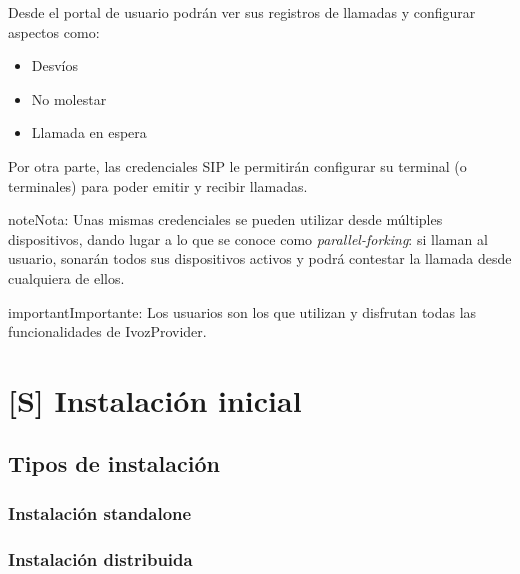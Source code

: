 \documentclass[letterpaper,10pt,spanish]{sphinxmanual}
\begin{document}
Desde el portal de usuario podrán ver sus registros de llamadas y configurar aspectos como:
\begin{itemize}
\item {} 
Desvíos

\item {} 
No molestar

\item {} 
Llamada en espera

\end{itemize}

Por otra parte, las credenciales SIP le permitirán configurar su terminal (o terminales) para poder emitir y recibir llamadas.

\begin{notice}{note}{Nota:}
Unas mismas credenciales se pueden utilizar desde múltiples dispositivos, dando lugar a lo que se conoce como \emph{parallel-forking}: si llaman al usuario, sonarán todos sus dispositivos activos y podrá contestar la llamada desde cualquiera de ellos.
\end{notice}

\begin{notice}{important}{Importante:}
Los usuarios son los que utilizan y disfrutan todas las funcionalidades de IvozProvider.
\end{notice}


\chapter{{[}S{]} Instalación inicial}
\label{installation/index:s-instalacion-inicial}\label{installation/index::doc}

\section{Tipos de instalación}
\label{installation/install_types::doc}\label{installation/install_types:tipos-de-instalacion}

\subsection{Instalación standalone}
\label{installation/install_types:instalacion-standalone}\label{installation/install_types:id1}

\subsection{Instalación distribuida}
\label{installation/install_types:instalacion-distribuida}\label{installation/install_types:id2}
\end{document}

